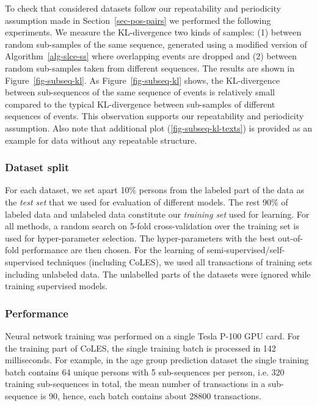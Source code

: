 \documentclass[sigconf]{acmart}
\begin{document}
To check that considered datasets follow our repeatability and periodicity assumption made in Section~\ref{sec-pos-pairs}
we performed the following experiments. We measure the KL-divergence two kinds of samples: (1) between random sub-samples of the same sequence, generated using a modified version of Algorithm~\ref{alg-slce-ss} where overlapping events are dropped and (2) between random sub-samples taken from different sequences. The results are shown in Figure~\ref{fig-subseq-kl}. As Figure~\ref{fig-subseq-kl} shows, the KL-divergence between sub-sequences of the same sequence of events is relatively small compared to the typical KL-divergence between sub-samples of different sequences of events. This observation supports our repeatability and periodicity assumption.
Also note that additional plot (\ref{fig-subseq-kl-texts}) is provided as an example for data without any repeatable structure.

\subsubsection{Dataset split}

For each dataset, we set apart 10\% persons from the labeled part of the data as the \textit{test set} that we used for evaluation of different models. The rest 90\% of labeled data and unlabeled data constitute our \textit{training set} used for learning. For all methods, a random search on 5-fold cross-validation over the training set is used for hyper-parameter selection. The hyper-parameters with the best out-of-fold performance are then chosen.
For the learning of semi-supervised/self-supervised techniques (including CoLES), we used all transactions of training sets including unlabeled data. The unlabelled parts of the datasets were ignored while training supervised models.

\subsubsection{Performance}

Neural network training was performed on a single Tesla P-100 GPU card. For the training part of CoLES, the single training batch is processed in 142 milliseconds. For example, in the age group prediction dataset the single training batch contains 64 unique persons with 5 sub-sequences per person, i.e. 320 training sub-sequences in total, the mean number of transactions in a sub-sequence is 90, hence, each batch contains about 28800 transactions.
\end{document}
